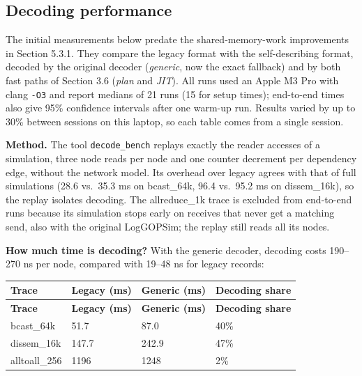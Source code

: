 \documentclass[10pt,a4paper]{article}
\begin{document}
\hypertarget{decoding-performance}{}
\subsection{Decoding performance}

The initial measurements below predate the shared-memory-work improvements in Section 5.3.1. They compare the legacy format with the self-describing format, decoded by the original decoder (\emph{generic}, now the exact fallback) and by both fast paths of Section 3.6 (\emph{plan} and \emph{JIT}). All runs used an Apple M3 Pro with clang \texttt{-\allowbreak{}O3} and report medians of 21 runs (15 for setup times); end-to-end times also give 95\% confidence intervals after one warm-up run. Results varied by up to 30\% between sessions on this laptop, so each table comes from a single session.

\textbf{Method.} The tool \texttt{decode\_\allowbreak{}bench} replays exactly the reader accesses of a simulation, three node reads per node and one counter decrement per dependency edge, without the network model. Its overhead over legacy agrees with that of full simulations (28.6 vs.\ 35.3 ms on bcast\_64k, 96.4 vs.\ 95.2 ms on dissem\_16k), so the replay isolates decoding. The allreduce\_1k trace is excluded from end-to-end runs because its simulation stops early on receives that never get a matching send, also with the original LogGOPSim; the replay still reads all its nodes.

\textbf{How much time is decoding?} With the generic decoder, decoding costs 190--270 ns per node, compared with 19--48 ns for legacy records:

{\small
\begin{longtable}{P{0.3\dimexpr{}\tabcolsep\relax}P{0.2\dimexpr{}\tabcolsep\relax}P{0.2\dimexpr{}\tabcolsep\relax}P{0.3\dimexpr{}\tabcolsep\relax}}
\toprule
\textbf{Trace} & \textbf{Legacy (ms)} & \textbf{Generic (ms)} & \textbf{Decoding share} \\
\midrule
\endfirsthead
\toprule
\textbf{Trace} & \textbf{Legacy (ms)} & \textbf{Generic (ms)} & \textbf{Decoding share} \\
\midrule
\endhead
\bottomrule
\endfoot
bcast\_64k & 51.7 & 87.0 & 40\% \\
dissem\_16k & 147.7 & 242.9 & 47\% \\
alltoall\_256 & 1196 & 1248 & 2\% \\
\end{longtable}
}
\end{document}

